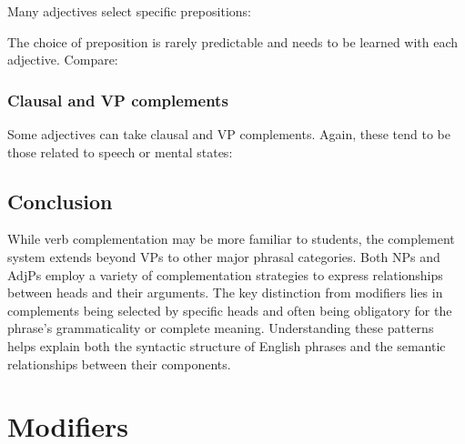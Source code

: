 Many adjectives select specific prepositions:

\ea
    \z
\z

The choice of preposition is rarely predictable and needs to be learned with each adjective. Compare:

\ea
    \z
\z

\subsubsection{Clausal and VP complements}

Some adjectives can take clausal and VP complements. Again, these tend to be those related to speech or mental states:

\ea
    \z
\z{}


\subsection{Conclusion}

While verb complementation may be more familiar to students, the complement system extends beyond VPs to other major phrasal categories. Both NPs and AdjPs employ a variety of complementation strategies to express relationships between heads and their arguments. The key distinction from modifiers lies in complements being selected by specific heads and often being obligatory for the phrase's grammaticality or complete meaning. Understanding these patterns helps explain both the syntactic structure of English phrases and the semantic relationships between their components.

\section{Modifiers} \label{sec:modifiers}

